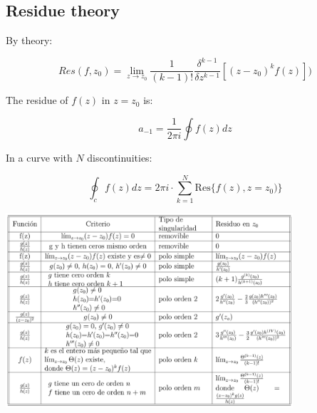 \documentclass[letterpaper]{article}
\begin{document}
	\begin{multicols}{2}
		\section{Residue theory}
				By theory:
		
			\[Res(f, z_0) = \lim_{z \to z_0} \frac{1}{(k-1)!} \frac{\delta^{k-1}}{\delta z^{k-1}} [(z-z_0)^{k}f(z)])\]
			
			The residue of \(f(z)\) in \(z = z_0\) is:
			
			\[a_{-1} = \frac{1}{2 \pi i} \oint f(z)dz \]
			
			In a curve with \(N\) discontinuities:
			
			\[\oint_{c} f(z)dz = 2 \pi i \cdot \sum_{k = 1}^{N} \text{Res} \{f(z), z = z_0)\}\]
	\end{multicols}
            \begin{center}
                \includegraphics[width=0.8\textwidth]{ResidueTable}
            \end{center}
\end{document}
